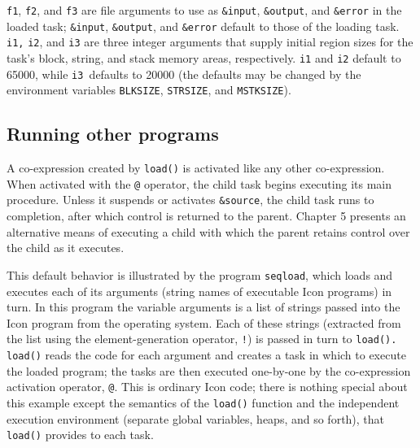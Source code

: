{\texttt{f1}}, {\texttt{f2}},
and {\texttt{f3}}{ }are file
arguments to use as {\texttt{\&input}},
{\texttt{\&output}}, and
{\texttt{\&error}} in the loaded task;
{\texttt{\&input}},
{\texttt{\&output}}, and
{\texttt{\&error}}{\textrm{
}}default to those of the loading task.{\textrm{
}}{\texttt{i1,}} {\texttt{i2}},
and {\texttt{i3}} are three integer arguments that
supply initial region sizes for the task's block,
string, and stack memory areas, respectively.
{\texttt{i1}} and {\texttt{i2}}
default to 65000, while {\texttt{i3 }}defaults to
20000 (the defaults may be changed by the environment variables
{\texttt{BLKSIZE}},
{\texttt{STRSIZ}}\texttt{E}, and
{\texttt{MSTKSIZE}}). 

\subsection{Running other programs}

A co-expression created by {\texttt{load()}} is
activated like any other co-expression. When activated with the
{\texttt{@}} operator, the child task begins
executing its main procedure. Unless it suspends or activates
{\texttt{\&source}}, the child task runs to
completion, after which control is returned to the parent. Chapter 5
presents an alternative means of executing a child with which the
parent retains control over the child as it executes. 

This default behavior is illustrated by the program
{\texttt{seqload}}, which loads and executes each
of its arguments (string names of executable Icon programs) in turn. In
this program the variable arguments is a list of strings passed into
the Icon program from the operating system. Each of these strings
(extracted from the list using the element-generation operator,
{\texttt{!}}) is passed in turn to
{\texttt{load()}}\texttt{.
}{\texttt{load()}} reads the code for each argument
and creates a task in which to execute the loaded program; the tasks
are then executed one-by-one by the co-expression activation operator,
{\texttt{@}}. This is ordinary Icon code; there is
nothing special about this example except the semantics of the
{\texttt{load()}} function and the independent
execution environment (separate global variables, heaps, and so forth),
that {\texttt{load()}}{
}provides to each task. 


